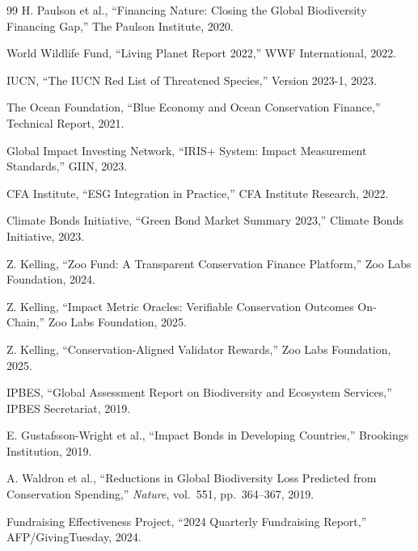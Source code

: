\documentclass[11pt,letterpaper]{article}
\begin{document}
\begin{thebibliography}{99}
H. Paulson et al., ``Financing Nature: Closing the Global Biodiversity Financing Gap,'' The Paulson Institute, 2020.

World Wildlife Fund, ``Living Planet Report 2022,'' WWF International, 2022.

IUCN, ``The IUCN Red List of Threatened Species,'' Version 2023-1, 2023.

The Ocean Foundation, ``Blue Economy and Ocean Conservation Finance,'' Technical Report, 2021.

Global Impact Investing Network, ``IRIS+ System: Impact Measurement Standards,'' GIIN, 2023.

CFA Institute, ``ESG Integration in Practice,'' CFA Institute Research, 2022.

Climate Bonds Initiative, ``Green Bond Market Summary 2023,'' Climate Bonds Initiative, 2023.

Z. Kelling, ``Zoo Fund: A Transparent Conservation Finance Platform,'' Zoo Labs Foundation, 2024.

Z. Kelling, ``Impact Metric Oracles: Verifiable Conservation Outcomes On-Chain,'' Zoo Labs Foundation, 2025.

Z. Kelling, ``Conservation-Aligned Validator Rewards,'' Zoo Labs Foundation, 2025.

IPBES, ``Global Assessment Report on Biodiversity and Ecosystem Services,'' IPBES Secretariat, 2019.

E. Gustafsson-Wright et al., ``Impact Bonds in Developing Countries,'' Brookings Institution, 2019.

A. Waldron et al., ``Reductions in Global Biodiversity Loss Predicted from Conservation Spending,'' \emph{Nature}, vol.\ 551, pp.\ 364--367, 2019.

Fundraising Effectiveness Project, ``2024 Quarterly Fundraising Report,'' AFP/GivingTuesday, 2024.

\end{thebibliography}
\end{document}
